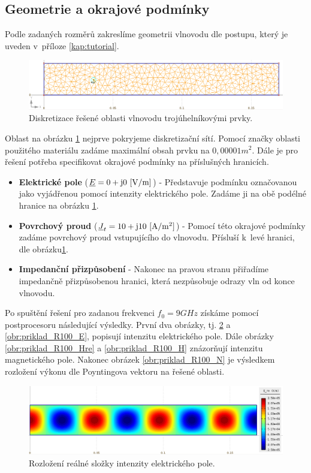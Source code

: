\subsection*{Geometrie a okrajové podmínky}
Podle zadaných rozměrů zakreslíme geometrii vlnovodu dle postupu, který je uveden v~příloze \ref{kap:tutorial}. 
\begin{figure}[!h]
	\centering
	\includegraphics[width=15cm]{priklad_R100_diskretizace.png}
	\caption{Diskretizace řešené oblasti vlnovodu trojúhelníkovými prvky.}
	\label{obr:priklad_R100_diskretizace}
\end{figure}
Oblast na obrázku \ref{obr:priklad_R100_diskretizace} nejprve pokryjeme diskretizační sítí. Pomocí značky oblasti použitého materiálu zadáme maximální obsah prvku na $0,00001 \unit{m^{2}}$. Dále je pro řešení potřeba specifikovat okrajové podmínky na příslušných hranicích.
\begin{itemize}
\item {\bf Elektrické pole} (${\underline{E}} = 0 + \mathrm{j}0\mathrm{\ [V/m]}$) - Představuje podmínku označovanou jako  vyjádřenou pomocí intenzity elektrického pole. Zadáme ji na obě podélné hranice na obrázku \ref{obr:priklad_R100_diskretizace}.
\item {\bf Povrchový proud} (${\underline{J}}_{t} = 10 + \mathrm{j}10\mathrm{\ [A/m^{2}]}$) - Pomocí této okrajové podmínky zadáme povrchový proud vstupujícího do vlnovodu. Přísluší k~levé hranici, dle obrázku\ref{obr:priklad_R100_diskretizace}.
\item {\bf Impedanční přizpůsobení} - Nakonec na pravou stranu přiřadíme impedančně přizpůsobenou hranici, která nezpůsobuje odrazy vln od konce vlnovodu.
\end{itemize}
Po spuštění řešení pro zadanou frekvenci $f_0 = 9\unit{GHz}$ získáme pomocí postprocesoru následující výsledky. První dva obrázky, tj. \ref{obr:priklad_R100_Ere} a \ref{obr:priklad_R100_E}, popisují intenzitu elektrického pole. Dále obrázky \ref{obr:priklad_R100_Hre} a \ref{obr:priklad_R100_H} znázorňují intenzitu magnetického pole. Nakonec obrázek \ref{obr:priklad_R100_N} je výsledkem rozložení výkonu dle Poyntingova vektoru na řešené oblasti.
\begin{figure}[!h]
	\centering
	\includegraphics[width=15cm]{priklad_R100_Ere.png}
	\caption{Rozložení reálné složky intenzity elektrického pole.}
	\label{obr:priklad_R100_Ere}
\end{figure}
